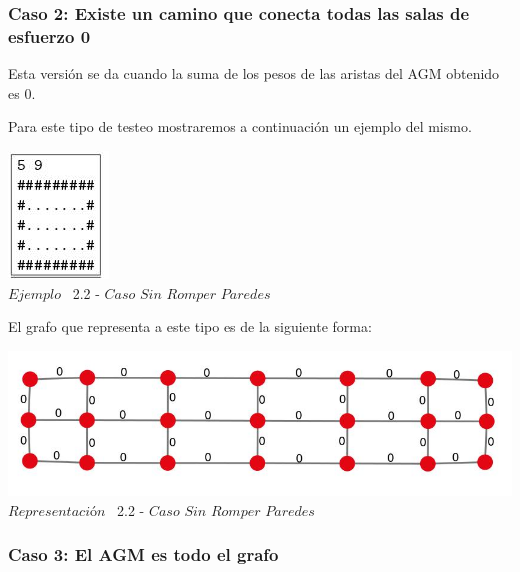  \begin{center}
 \subsubsection*{Caso 2: Existe un camino que conecta todas las salas de esfuerzo 0}
\end{center}

Esta versi\'on se da cuando la suma de los pesos de las aristas del AGM obtenido es 0. 

Para este tipo de testeo mostraremos a continuaci\'on un ejemplo del mismo.\\

\vspace*{0.3cm} \vspace*{0.3cm}
  \begin{center}
 \includegraphics[scale=1.6]{./EJ2/ej2sinpared.jpeg}
 \\{$Ejemplo$ \ 2.2 - $Caso$ $Sin$ $Romper$ $Paredes$}
  \end{center}
  \vspace*{0.3cm}

El grafo que representa a este tipo es de la siguiente forma:\\

\vspace*{0.3cm} \vspace*{0.3cm}
  \begin{center}
 \includegraphics[scale=0.5]{./EJ2/ej2grafosinpared.jpeg}
 \\{$Representación$ \ 2.2 - $Caso$ $Sin$ $Romper$ $Paredes$}
  \end{center}
  \vspace*{0.3cm}


\begin{center}
\subsubsection*{Caso 3: El AGM es todo el grafo}
\end{center}

